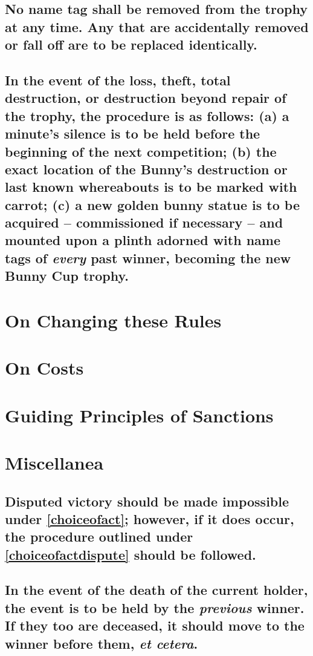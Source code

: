 \documentclass[a4paper]{article}
\begin{document}
\subsection{No name tag shall be removed from the trophy at any time. Any that are accidentally removed or fall off are to be replaced identically.}
\subsection{In the event of the loss, theft, total destruction, or destruction beyond repair of the trophy, the procedure is as follows: (a) a minute's silence is to be held before the beginning of the next competition; (b) the exact location of the Bunny's destruction or last known whereabouts is to be marked with carrot; (c) a new golden bunny statue is to be acquired – commissioned if necessary – and mounted upon a plinth adorned with name tags of \emph{every} past winner, becoming the new Bunny Cup trophy.}




\section{On Changing these Rules}

\section{On Costs}\label{costs}

\section{Guiding Principles of Sanctions}

\section{Miscellanea}
\subsection{Disputed victory should be made impossible under \ref{choiceofact}; however, if it does occur,  the procedure outlined under \ref{choiceofactdispute} should be followed.}
\subsection{In the event of the death of the current holder, the event is to be held by the \emph{previous} winner. If they too are deceased, it should move to the winner before them, \emph{et cetera}.}
\end{document}
